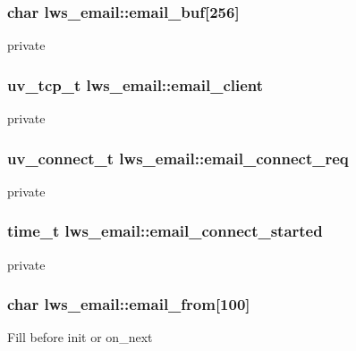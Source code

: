 \subsubsection[{\texorpdfstring{email\+\_\+buf}{email\_buf}}]{\setlength{\rightskip}{0pt plus 5cm}char lws\+\_\+email\+::email\+\_\+buf\mbox{[}256\mbox{]}}\hypertarget{structlws__email_a8f34ec0643a817be67ef4276aeb7fb82}{}\label{structlws__email_a8f34ec0643a817be67ef4276aeb7fb82}
private 
\subsubsection[{\texorpdfstring{email\+\_\+client}{email\_client}}]{\setlength{\rightskip}{0pt plus 5cm}uv\+\_\+tcp\+\_\+t lws\+\_\+email\+::email\+\_\+client}\hypertarget{structlws__email_a01f31934166dc6d01e8a375012f8ad1e}{}\label{structlws__email_a01f31934166dc6d01e8a375012f8ad1e}
private 
\subsubsection[{\texorpdfstring{email\+\_\+connect\+\_\+req}{email\_connect\_req}}]{\setlength{\rightskip}{0pt plus 5cm}uv\+\_\+connect\+\_\+t lws\+\_\+email\+::email\+\_\+connect\+\_\+req}\hypertarget{structlws__email_a5f53d4c5a1e34b0dcaa8787e2eabb1b3}{}\label{structlws__email_a5f53d4c5a1e34b0dcaa8787e2eabb1b3}
private 
\subsubsection[{\texorpdfstring{email\+\_\+connect\+\_\+started}{email\_connect\_started}}]{\setlength{\rightskip}{0pt plus 5cm}time\+\_\+t lws\+\_\+email\+::email\+\_\+connect\+\_\+started}\hypertarget{structlws__email_a9747ca85597788c2d118d287df47b7c1}{}\label{structlws__email_a9747ca85597788c2d118d287df47b7c1}
private 
\subsubsection[{\texorpdfstring{email\+\_\+from}{email\_from}}]{\setlength{\rightskip}{0pt plus 5cm}char lws\+\_\+email\+::email\+\_\+from\mbox{[}100\mbox{]}}\hypertarget{structlws__email_af7f0ae934347d81071f63a963301f9e2}{}\label{structlws__email_af7f0ae934347d81071f63a963301f9e2}
Fill before init or on\+\_\+next 
